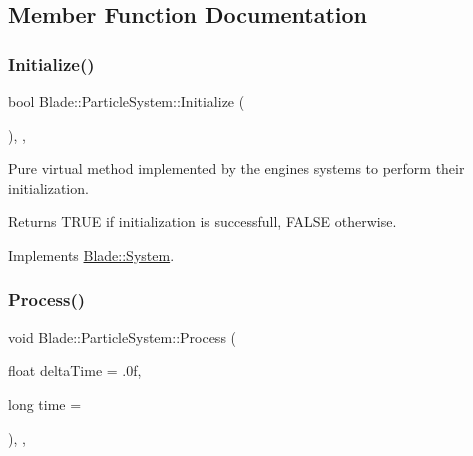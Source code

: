 \subsection{Member Function Documentation}
\mbox{\label{class_blade_1_1_particle_system_ae409003e325c44d82a3dcd1794ffb77d}} 
\subsubsection{\texorpdfstring{Initialize()}{Initialize()}}
{\footnotesize\ttfamily bool Blade\+::\+Particle\+System\+::\+Initialize (\begin{DoxyParamCaption}{ }\end{DoxyParamCaption})\hspace{0.3cm}{\ttfamily [override]}, {\ttfamily [virtual]}, {\ttfamily [noexcept]}}



Pure virtual method implemented by the engine\textquotesingle{}s systems to perform their initialization. 

\begin{DoxyReturn}{Returns}
T\+R\+UE if initialization is successfull, F\+A\+L\+SE otherwise. 
\end{DoxyReturn}


Implements \hyperlink{class_blade_1_1_system_a63fa00af40dc54d093300eff4785f26f}{Blade\+::\+System}.

\mbox{\label{class_blade_1_1_particle_system_a01e4983673061d797da072324a98d8d4}} 
\subsubsection{\texorpdfstring{Process()}{Process()}}
{\footnotesize\ttfamily void Blade\+::\+Particle\+System\+::\+Process (\begin{DoxyParamCaption}\item[{float}]{delta\+Time = {\ttfamily .0f},  }\item[{long}]{time = {} }\end{DoxyParamCaption})\hspace{0.3cm}{\ttfamily [override]}, {\ttfamily [virtual]}, {\ttfamily [noexcept]}}



